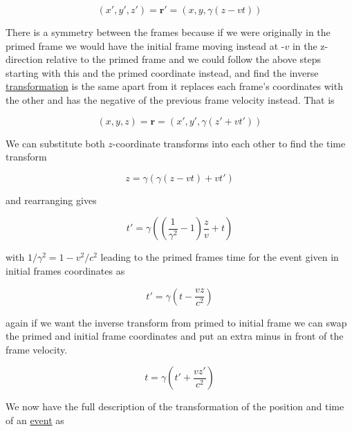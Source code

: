 \begin{equation}
	({x{'}},{y{'}},{z{'}}) = {\mathbf{r}{'}} = ({x},{y},{\gamma}({z}-{v}{t}) )
\end{equation}

There is a symmetry between the frames because if we were originally in the primed frame we would have the initial frame moving instead at -${v}$ in the z-direction relative to the primed frame and we could follow the above steps starting with this and the primed coordinate instead, and find the inverse \hyperlink{def-transform}{transformation} is the same apart from it replaces each frame's coordinates with the other and has the negative of the previous frame velocity instead.
That is

\begin{equation}
	({x},{y},{z}) = {\mathbf{r}} = ({x{'}},{y{'}},{\gamma}({z{'}}+{v}{t{'}}) )
\end{equation}

We can substitute both $z$-coordinate transforms into each other to find the time transform

\begin{equation}
	{z} = {\gamma} ( {\gamma} ({z}-{v}{t}) + {v}{t{'}})
\end{equation}

and rearranging gives

\begin{equation}
	{t{'}} = {\gamma} \left( \left( \dfrac{1}{{\gamma}^2}-1 \right)\frac{z}{v} + t \right)
\end{equation}

with $1/{\gamma}^{2} = 1-{v}^2/{c}^2$ leading to the primed frames time for the event given in initial frames coordinates as

\begin{equation}
	{t{'}} = {\gamma} \left( t-\dfrac{{v}{z}}{{c}^2} \right)
\end{equation}

again if we want the inverse transform from primed to initial frame we can swap the primed and initial frame coordinates and put an extra minus in front of the frame velocity.

\begin{equation}
	{t} = {\gamma} \left( t{'}+\dfrac{{v}{z{'}}}{{c}^2} \right)
\end{equation}

We now have the full description of the transformation of the position and time of an \hyperlink{def-event}{event} as

